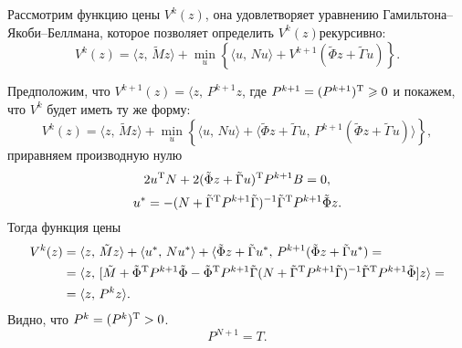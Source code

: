 Рассмотрим функцию цены $V^k(z)$, она удовлетворяет уравнению Гамиль\-тона--Якоби--Беллмана, которое позволяет определить $V^k(z) рекурсивно$:
$$
V^k(z) = \langle z,\,\tilde M z\rangle
+
\min\limits_{u}
\left\{
\langle
u,\,N u
\rangle
+
V^{k+1}(\tilde\Phi z + \tilde\Gamma u)
\right\}.
$$

Предположим, что $V^{k+1}(z) = \langle z,\, P^{k+1} z$, где $P^{k+1} = (P^{k+1})^\mathrm{T} \geqslant 0$ и покажем, что $V^k$ будет иметь ту же форму:
$$
V^k(z) = \langle z,\, \tilde M z \rangle + \min\limits_{u}\left\{
\langle u,\,N u \rangle
+
\langle
\tilde\Phi z + \tilde\Gamma u,\,
P^{k+1}(\tilde\Phi z + \tilde\Gamma u)
\rangle
\right\},
$$
приравняем производную нулю
$$
        2u^\mathrm{T} N + 2(\tilde\Phi z + \tilde\Gamma u)^\mathrm{T} P^{k+1} B = 0,
$$
$$
        u^* = -(N + \tilde\Gamma^\mathrm{T} P^{k+1}\tilde\Gamma)^{-1}\tilde\Gamma^\mathrm{T} P^{k+1} \tilde\Phi z.
$$
Тогда функция цены
\begin{align*}
V^k(z) &=
\langle
z,\,\tilde M z
\rangle
+
\langle
u^*,\,Nu^*
\rangle
+
\langle
\tilde\Phi z + \tilde\Gamma u^*
,\,P^{k+1}(\tilde\Phi z + \tilde\Gamma u^*) =\\
&=
\langle
z,\,
[\tilde M
+
\tilde\Phi^\mathrm{T} P^{k+1} \tilde\Phi
-
\tilde\Phi^\mathrm{T} P^{k+1} \tilde\Gamma (N + \tilde\Gamma^\mathrm{T} P^{k+1} \tilde\Gamma)^{-1} \tilde\Gamma^\mathrm{T} P^{k+1} \tilde\Phi
]z\rangle = \\
&=
\langle z,\, P^k z \rangle.
\end{align*}
Видно, что $P^k = (P^k)^\mathrm{T} > 0$.
$$
P^{N+1} = T.
$$